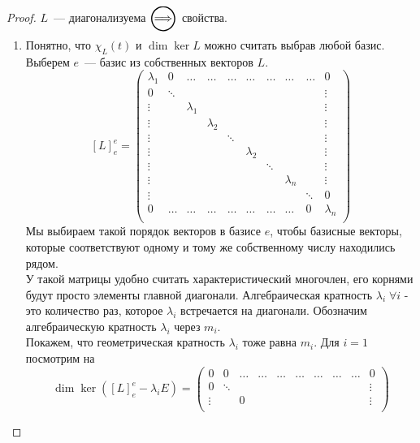 \begin{proof}
    $L$~--- диагонализуема $\ora$ свойства.
    \begin{enumerate}
        \item 
            Понятно, что $\chi_L(t)$ и $\dim \ker L$ можно считать выбрав любой базис.
            Выберем $e$~--- базис из собственных векторов $L$. 
            \[
              [L]^e_e = \begin{pmatrix}
                \lambda_1 & 0 & \dots & \dots & \dots & \dots & \dots & \dots & \dots & 0 \\
                0 & \ddots & & & & & & & & \vdots\\
                \vdots & & \lambda_1 & & & & & & & \vdots\\
                \vdots & & & \lambda_2 & & & & & & \vdots\\
                \vdots & & & & \ddots & & & & & \vdots\\
                \vdots & & & & & \lambda_2 & & & & \vdots\\
                \vdots & & & & & & \ddots & & & \vdots\\
                \vdots & & & & & & & \lambda_n & & \vdots\\
                \vdots & & & & & & & & \ddots & 0\\
                0 & \dots & \dots & \dots & \dots & \dots & \dots & \dots & 0 & \lambda_n \\
              \end{pmatrix}
            \]
            Мы выбираем такой порядок векторов в базисе $e$, чтобы базисные векторы, которые соответствуют одному и тому же собственному числу находились рядом. \\
            У такой матрицы удобно считать характеристический многочлен, его корнями будут просто элементы главной диагонали. Алгебраическая кратность $\lambda_i \; \forall i$ - это количество раз, которое $\lambda_i$ встречается на диагонали. Обозначим алгебраическую кратность $\lambda_i$ через $m_i$. \\
            Покажем, что геометрическая кратность $\lambda_i$ тоже равна $m_i$. Для $i = 1$ посмотрим на 
            \[
              \dim \ker ([L]^e_e - \lambda_i E) = \begin{pmatrix}
                0 & 0 & \dots & \dots & \dots & \dots & \dots & \dots & \dots & 0 \\
                0 & \ddots & & & & & & & & \vdots\\
                \vdots & & 0 & & & & & & & \vdots\\

\end{pmatrix}\]
\end{enumerate}
\end{proof}
